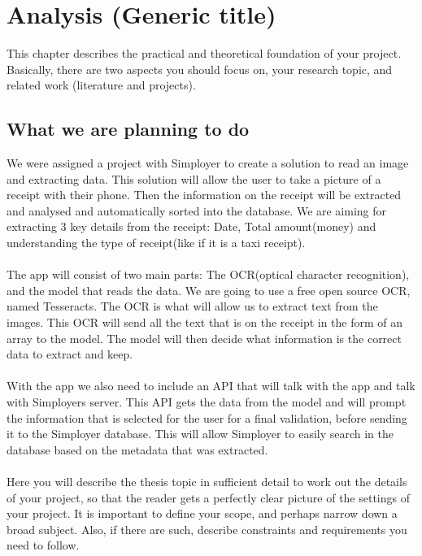 \cleardoublepage
\chapter{Analysis (Generic title)}
\label{ch:analysis}

This chapter describes the practical and theoretical foundation of your project.
Basically, there are two aspects you should focus on, your research topic, and related work (literature and projects).

\section{What we are planning to do}\label{sec:research-topic-(generic-title)}

We were assigned a project with Simployer to create a solution to read an image and extracting data.
This solution will allow the user to take a picture of a receipt with their phone.
Then the information on the receipt will be extracted and analysed and automatically sorted into the database.
We are aiming for extracting 3 key details from the receipt: Date, Total amount(money) and understanding the type of receipt(like if it is a taxi receipt).\\
\\
The app will consist of two main parts: The OCR(optical character recognition), and the model that reads the data.
We are going to use a free open source OCR, named Tesseracts.
The OCR is what will allow us to extract text from the images.
This OCR will send all the text that is on the receipt in the form of an array to the model.
The model will then decide what information is the correct data to extract and keep.\\
\\
With the app we also need to include an API that will talk with the app and talk with Simployers server.
This API gets the data from the model and will prompt the information that is selected for the user for a final
validation, before sending it to the Simployer database.
This will allow Simployer to easily search in the database based on the metadata that was extracted.\\
\\
Here you will describe the thesis topic in sufficient detail to work out the details of your project, so that the reader gets a perfectly clear picture of the settings of your project.
It is important to define your scope, and perhaps narrow down a broad subject.
Also, if there are such, describe constraints and requirements you need to follow.


